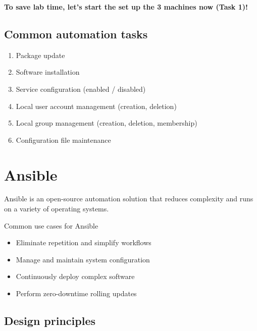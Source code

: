 \documentclass[slides]{pgnotes}
\begin{document}
\textbf{To save lab time, let's start the set up the 3 machines now (Task 1)!}


\subsection{Common automation tasks}

\begin{enumerate}
\item Package update
\item Software installation
\item Service configuration (enabled / disabled)
\item Local user account management (creation, deletion)
\item Local group management (creation, deletion, membership)
\item Configuration file maintenance
\end{enumerate}

\section{Ansible}

Ansible is an open-source automation solution that reduces complexity and runs on a variety of operating systems.

\begin{greenbox}{Common use cases for Ansible}
\begin{itemize}
\item Eliminate repetition and simplify workflows
\item Manage and maintain system configuration
\item Continuously deploy complex software
\item Perform zero-downtime rolling updates
\end{itemize}
\end{greenbox}


\subsection{Design principles}
\end{document}

